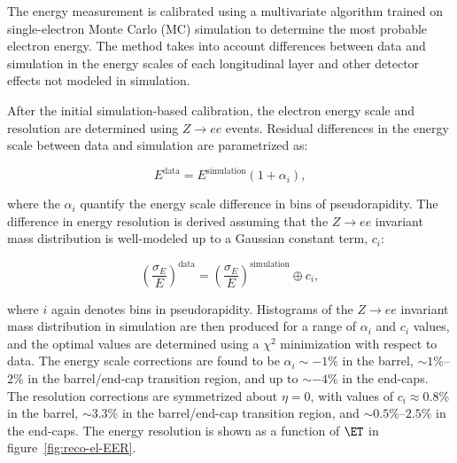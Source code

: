 The energy measurement is calibrated using a multivariate algorithm trained on single-electron Monte Carlo (MC) simulation to determine the most probable electron energy. The method takes into account differences between data and simulation in the energy scales of each longitudinal layer and other detector effects not modeled in simulation. 

After the initial simulation-based calibration, the electron energy scale and resolution are determined using $Z\rightarrow ee$ events. Residual differences in the energy scale between data and simulation are parametrized as:

\begin{equation}
	E^{\mathrm{data}} = E^{\mathrm{simulation}} (1 + \alpha_i),
\end{equation}

where the $\alpha_i$ quantify the energy scale difference in bins of pseudorapidity. The difference in energy resolution is derived assuming that the $Z\rightarrow ee$ invariant mass distribution is well-modeled up to a Gaussian constant term, $c_i$: 

\begin{equation}
	\left(\frac{\sigma_E}{E}\right)^{\mathrm{data}} = \left(\frac{\sigma_E}{E}\right)^{\mathrm{simulation}} \oplus c_i,
\end{equation}

where $i$ again denotes bins in pseudorapidity. Histograms of the $Z\rightarrow ee$ invariant mass distribution in simulation are then produced for a range of $\alpha_i$ and $c_i$ values, and the optimal values are determined using a $\chi^2$ minimization with respect to data. The energy scale corrections are found to be $\alpha_i\sim -1\%$ in the barrel, $\sim1\%$--$2\%$ in the barrel/end-cap transition region, and up to $\sim-4\%$ in the end-caps. The resolution corrections are symmetrized about $\eta=0$, with values of $c_i\approx 0.8\%$ in the barrel, $\sim3.3\%$ in the barrel/end-cap transition region, and $\sim0.5\%$--$2.5\%$ in the end-caps. The energy resolution is shown as a function of $\ET$ in figure~\ref{fig:reco-el-EER}.

